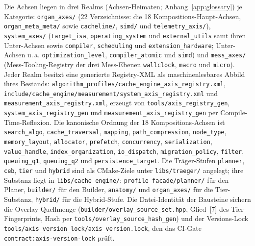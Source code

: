 Die Achsen liegen in drei Realms (Achsen-Heimaten; Anhang~\ref{app:glossary}) je Kategorie: \texttt{organ\_\allowbreak{}axes/} (22 Verzeichnisse: die 18
Kompositions-Haupt-Achsen, \texttt{organ\_\allowbreak{}meta\_\allowbreak{}meta/} sowie \texttt{cacheline/}, \texttt{simd/} und
\texttt{telemetry\_\allowbreak{}axis/}), \texttt{system\_\allowbreak{}axes/} (\texttt{target\_\allowbreak{}isa}, \texttt{operating\_\allowbreak{}system} und
\texttt{external\_\allowbreak{}utils} samt ihren Unter-Achsen sowie \texttt{compiler}, \texttt{scheduling} und
\texttt{extension\_\allowbreak{}hardware}; Unter-Achsen u.\,a. \texttt{optimization\_\allowbreak{}level}, \texttt{compiler\_\allowbreak{}atomic}
und \texttt{simd}) und \texttt{mess\_\allowbreak{}axes/} (Mess-Tooling-Registry der drei Mess-Ebenen
\texttt{wallclock}, \texttt{macro} und \texttt{micro}). Jeder Realm besitzt eine generierte Registry-XML
als maschinenlesbares Abbild ihres Bestands:
\texttt{algorithm\_\allowbreak{}profiles/\allowbreak{}cache\_\allowbreak{}engine\_\allowbreak{}axis\_\allowbreak{}registry.xml},
\texttt{include/\allowbreak{}cache\_\allowbreak{}engine/\allowbreak{}measurement/\allowbreak{}system\_\allowbreak{}axis\_\allowbreak{}registry.xml}
und \texttt{measurement\_\allowbreak{}axis\_\allowbreak{}registry.xml}, erzeugt von \texttt{tools/\allowbreak{}axis\_\allowbreak{}registry\_\allowbreak{}gen},
\texttt{system\_\allowbreak{}axis\_\allowbreak{}registry\_\allowbreak{}gen} und \texttt{measurement\_\allowbreak{}axis\_\allowbreak{}registry\_\allowbreak{}gen} per
Compile-Time-Reflexion. Die kanonische Ordnung der 18 Kompositions-Achsen ist \texttt{search\_\allowbreak{}algo},
\texttt{cache\_\allowbreak{}traversal}, \texttt{mapping}, \texttt{path\_\allowbreak{}compression}, \texttt{node\_\allowbreak{}type},
\texttt{memory\_\allowbreak{}layout}, \texttt{allocator}, \texttt{prefetch}, \texttt{concurrency},
\texttt{serialization}, \texttt{value\_\allowbreak{}handle}, \texttt{index\_\allowbreak{}organization}, \texttt{io\_\allowbreak{}dispatch},
\texttt{migration\_\allowbreak{}policy}, \texttt{filter}, \texttt{queuing\_\allowbreak{}q1}, \texttt{queuing\_\allowbreak{}q2} und
\texttt{persistence\_\allowbreak{}target}. Die Träger-Stufen \texttt{planner}, \texttt{ceb}, \texttt{tier} und
\texttt{hybrid} sind als CMake-Ziele unter \texttt{libs/traeger/} angelegt; ihre Substanz liegt in
\texttt{libs/cache\_\allowbreak{}engine/}: \texttt{profile\_\allowbreak{}facade/planner/} für den Planer, \texttt{builder/} für den
Builder, \texttt{anatomy/} und \texttt{organ\_\allowbreak{}axes/} für die Tier-Substanz, \texttt{hybrid/} für die
Hybrid-Stufe. Die Datei-Identität der Bausteine sichern die Overlay-Quellmenge
(\texttt{builder/\allowbreak{}overlay\_\allowbreak{}source\_\allowbreak{}set.hpp}, Glied~[7] des Tier-Fingerprints, Hash per
\texttt{tools/\allowbreak{}overlay\_\allowbreak{}source\_\allowbreak{}hash\_\allowbreak{}gen}) und der Versions-Lock
\texttt{tools/\allowbreak{}axis\_\allowbreak{}version\_\allowbreak{}lock/\allowbreak{}axis\_\allowbreak{}version.lock}, den das CI-Gate
\texttt{contract:axis-version-lock} prüft.

